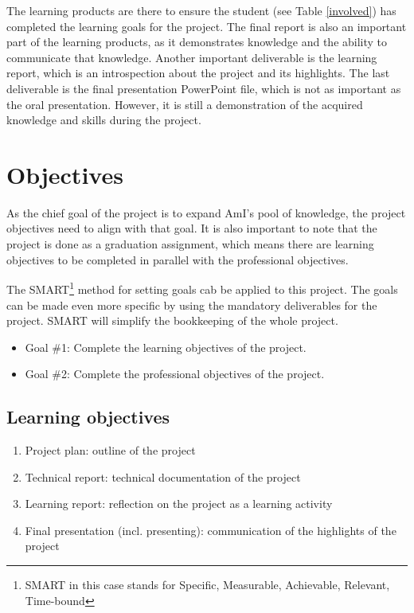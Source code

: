 \documentclass{report}
\begin{document}
	The learning products are there to ensure the student (see Table \ref{involved}) has completed the learning goals for the project. The final report is also an important part of the learning products, as it demonstrates knowledge and the ability to communicate that knowledge. Another important deliverable is the learning report, which is an introspection about the project and its highlights. The last deliverable is the final presentation PowerPoint file, which is not as important as the oral presentation. However, it is still a demonstration of the acquired knowledge and skills during the project.
	
	\section{Objectives}
	As the chief goal of the project is to expand AmI's pool of knowledge, the project objectives need to align with that goal. It is also important to note that the project is done as a graduation assignment, which means there are learning objectives to be completed in parallel with the professional objectives. 
	
	The SMART\footnote{SMART in this case stands for Specific, Measurable, Achievable, Relevant, Time-bound} method for setting goals cab be applied to this project. The goals can be made even more specific by using the mandatory deliverables for the project. SMART will simplify the bookkeeping of the whole project.
	
	\begin{itemize}
		\item Goal \#1: Complete the learning objectives of the project.
		\item Goal \#2: Complete the professional objectives of the project.
	\end{itemize}
	
	\subsection{Learning objectives}
	\begin{enumerate}
		\item Project plan: outline of the project
		\item Technical report: technical documentation of the project
		\item Learning report: reflection on the project as a learning activity
		\item Final presentation (incl. presenting): communication of the highlights of the project 
	\end{enumerate}
	
\end{document}
